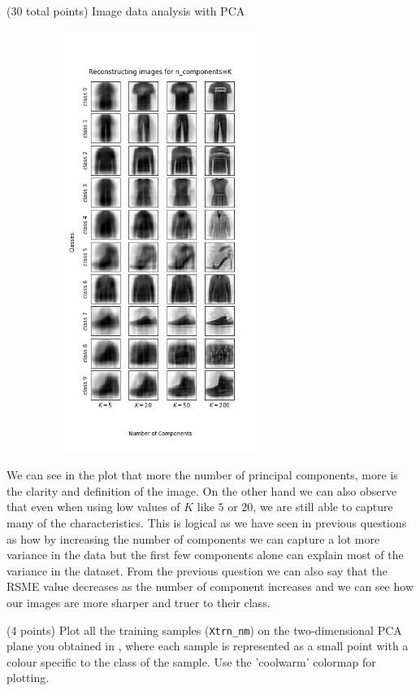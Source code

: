 \documentclass[12pt]{article}
\begin{document}
\begin{question}{(30 total points) Image data analysis with PCA}
\begin{subquestion}
      \begin{answerbox}{52em}
         \begin{center}
             \includegraphics[width=0.75\textwidth, height=37em]{results/1_7.png}
         \end{center}
         We can see in the plot that more the number of principal components, more is the clarity and definition of the image. On the other hand we can also observe that even when using low values of $K$ like $5$ or $20$, we are still able to capture many of the characteristics. This is logical as we have seen in previous questions as how by increasing the number of components we can capture a lot more variance in the data but the first few components alone can explain most of the variance in the dataset. From the previous question we can also say that the RSME value decreases as the number of component increases and we can see how our images are more sharper and truer to their class.
      \end{answerbox}
  


   \end{subquestion}
   \begin{subquestion}{(4 points)
       Plot all the training samples (\texttt{Xtrn\_nm}) on the
       two-dimensional PCA plane you obtained in , where each sample is
       represented as a small point with a colour specific to the class of
       the sample.  Use the 'coolwarm' colormap for plotting.
     } \label{Q1.8}



\end{subquestion}
\end{question}
\end{document}
